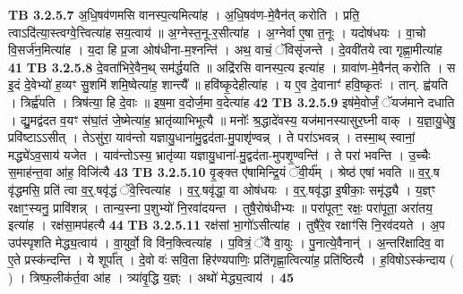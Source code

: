 \documentclass[17pt]{extarticle}
\begin{document}
{{{{{{{{{{{{{{{{{{{                  \newline
                                \textbf{ TB 3.2.5.7} \newline
                  अ॒धि॒षव॑णमसि वानस्प॒त्यमित्या॑ह । अ॒धि॒षव॑ण-मे॒वैन॑त् करोति । प्रति॒ त्वाऽदि॑त्या॒स्त्वग्वे॒त्त्वित्या॑ह सय॒त्वाय॑ ॥ अ॒ग्नेस्त॒नू-र॒सीत्या॑ह । अ॒ग्नेर्वा ए॒षा त॒नूः । यदोष॑धयः । वा॒चो वि॒सर्ज॑न॒मित्या॑ह । य॒दा हि प्र॒जा ओष॑धीना-म॒श्नन्ति॑ । अथ॒ वाचं॒ ॅविसृ॑जन्ते । दे॒ववी॑तये त्वा गृह्णा॒मीत्या॑ह \textbf{ 41} \newline
                  \newline
                                \textbf{ TB 3.2.5.8} \newline
                  दे॒वता॑भिरे॒वैन॒थ् सम॑र्द्धयति ॥ अद्रि॑रसि वानस्प॒त्य इत्या॑ह । ग्रावा॑ण-मे॒वैन॑त् करोति । स इ॒दं दे॒वेभ्यो॑ ह॒व्यꣳ सु॒शमि॑ शमि॒ष्वेत्या॑ह॒ शान्त्यै᳚ ॥ हवि॑ष्कृ॒देहीत्या॑ह । य ए॒व दे॒वानाꣳ॑ हवि॒ष्कृतः॑ । तान्. ह्व॑यति । त्रिर्ह्व॑यति । त्रिष॑त्या॒ हि दे॒वाः ॥ इष॒मा व॒दोर्ज॒मा व॒देत्या॑ह \textbf{ 42} \newline
                  \newline
                                \textbf{ TB 3.2.5.9} \newline
                  इष॑मे॒वोर्जं॒ ॅयज॑माने दधाति । द्यु॒मद्व॑दत व॒यꣳ स॑घां॒तं जे॒ष्मेत्या॑ह॒ भ्रातृ॑व्याभिभूत्यै ॥ मनोः᳚ श्र॒द्धादे॑वस्य॒ यज॑मानस्यासुर॒घ्नी वाक् । य॒ज्ञा॒यु॒धेषु॒ प्रवि॑ष्टाऽऽसीत् । तेऽसु॑रा॒ याव॑न्तो यज्ञायु॒धाना॑मु॒द्वद॑ता-मु॒पाशृ॑ण्वन्न् । ते परा॑ऽभवन्न् । तस्मा॒थ् स्वानां॒ मद्ध्ये॑ऽव॒साय॑ यजेत । याव॑न्तोऽस्य॒ भ्रातृ॑व्या यज्ञायु॒धाना॑-मु॒द्वद॑ता-मुपशृ॒ण्वन्ति॑ । ते परा॑ भवन्ति । उ॒च्चैः स॒माह॑न्त॒वा आ॑ह॒ विजि॑त्यै \textbf{ 43} \newline
                  \newline
                                \textbf{ TB 3.2.5.10} \newline
                  वृ॒ङ्क्त ए॑षामिन्द्रि॒यं ॅवी॒र्य᳚म् । श्रेष्ठ॑ एषां भवति ॥ व॒र्॒.ष वृ॑द्धमसि॒ प्रति॑ त्वा व॒र्॒.षवृ॑द्धं ॅवे॒त्त्वित्या॑ह । व॒र्॒.षवृ॑द्धा॒ वा ओष॑धयः । व॒र्॒.षवृ॑द्धा इ॒षीकाः॒ समृ॑द्ध्यै । य॒ज्ञ्ꣳ रक्षाꣳ॒॒स्यनु॒ प्रावि॑शन्न् । तान्य॒स्ना प॒शुभ्यो॑ नि॒रवा॑दयन्त । तुषै॒रोष॑धीभ्यः ॥ परा॑पूतꣳ॒॒ रक्षः॒ परा॑पूता॒ अरा॑तय॒ इत्या॑ह । रक्ष॑सा॒मप॑हत्यै \textbf{ 44} \newline
                  \newline
                                \textbf{ TB 3.2.5.11} \newline
                  रक्ष॑सां भा॒गो॑ऽसीत्या॑ह । तुषै॑रे॒व रक्षाꣳ॑सि नि॒रव॑दयते । अ॒प उप॑स्पृशति मेद्ध्य॒त्वाय॑ । वा॒युर्वो॒ वि वि॑न॒क्त्वित्या॑ह । प॒वित्रं॒ ॅवै वा॒युः । पु॒नात्ये॒वैनान्॑ । अ॒न्तरि॑क्षादिव॒ वा ए॒ते प्रस्क॑न्दन्ति । ये शूर्पा᳚त् । दे॒वो वः॑ सवि॒ता हिर॑ण्यपाणिः॒ प्रति॑गृह्णा॒त्वित्या॑ह॒ प्रति॑ष्ठित्यै । ह॒विषोऽस्क॑न्दाय ( ) । त्रिष्फ॒लीक॑र्त॒वा आ॑ह । त्र्या॑वृ॒द्धि य॒ज्ञ्ः । अथो॑ मेद्ध्य॒त्वाय॑ । \textbf{ 45} \newline
}}}}}}}}}}}}}}}}}}}
\end{document}
